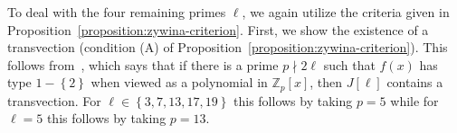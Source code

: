 To deal with the four remaining primes $\ell$, we again utilize the criteria given in Proposition~\ref{proposition:zywina-criterion}. 
First, we show the existence of a transvection (condition (A) of Proposition~\ref{proposition:zywina-criterion}). 
This follows from~\cite[Lemma 2.9]{anni2017constructing}, which says that if there is a prime $p \nmid 2 \ell$ such that $f(x)$ has type $1 - \left\{ 2 \right\}$ when viewed as a polynomial in $\mathbb Z_p[x]$, then $J[\ell]$ contains a transvection.
For $\ell \in \left\{ 3, 7,13,17,19 \right\}$ this follows by taking $p = 5$ while for $\ell =5$ this follows by taking $p = 13$.

%
%
